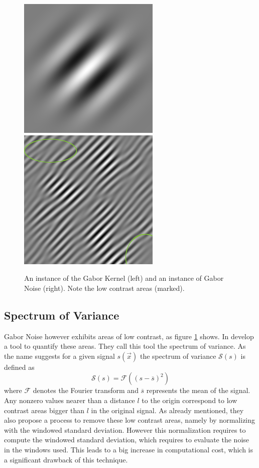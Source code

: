 \documentclass{utue} %
\begin{document}
\begin{figure}[h]
  \centering
  \includegraphics[width=0.45\linewidth]{images/gaborKernel}
  \includegraphics[width=0.45\linewidth]{images/gaborNoise}
  \caption{An instance of the Gabor Kernel (left) and an instance of Gabor Noise (right). Note the low contrast areas (marked).}\label{fig:gaborNoise}

\end{figure}

\subsection{Spectrum of Variance}
Gabor Noise however exhibits areas of low contrast, as figure \ref{fig:gaborNoise} shows. In \cite{spectrumOfVariance} \citeauthor{spectrumOfVariance} develop a tool to quantify these areas. They call this tool the spectrum of variance. As the name suggests for a given signal $s(\vec{x})$ the spectrum of variance $\mathcal{S}(s)$ is defined as
$$
\mathcal{S}(s) = \mathcal{F}((s-\overline{s})^2)
$$
where $\mathcal{F}$ denotes the Fourier transform and $\overline{s}$ represents the mean of the signal. Any nonzero values nearer than a distance $l$ to the origin correspond to low contrast areas bigger than $l$ in the original signal. As already mentioned, they also propose a process to remove these low contrast areas, namely by normalizing with the windowed standard deviation. However this normalization requires to compute the windowed standard deviation, which requires to evaluate the noise in the windows used. This leads to a big increase in computational cost, which is a significant drawback of this technique.
\end{document}
